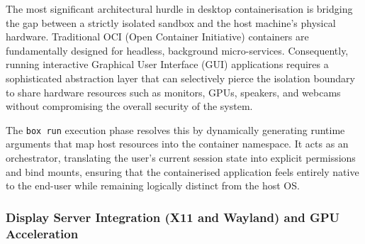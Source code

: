 \documentclass[journal,onecolumn]{IEEEtran}
\newcommand{\code}[1]{\texttt{#1}}
\begin{document}
The most significant architectural hurdle in desktop containerisation is bridging the gap between a strictly isolated sandbox and the host machine's physical hardware. Traditional OCI (Open Container Initiative) containers are fundamentally designed for headless, background micro-services. Consequently, running interactive Graphical User Interface (GUI) applications requires a sophisticated abstraction layer that can selectively pierce the isolation boundary to share hardware resources such as monitors, GPUs, speakers, and webcams without compromising the overall security of the system.

The \code{box run} execution phase resolves this by dynamically generating runtime arguments that map host resources into the container namespace. It acts as an orchestrator, translating the user's current session state into explicit permissions and bind mounts, ensuring that the containerised application feels entirely native to the end-user while remaining logically distinct from the host OS.

\subsubsection{Display Server Integration (X11 and Wayland) and GPU Acceleration}
\end{document}
